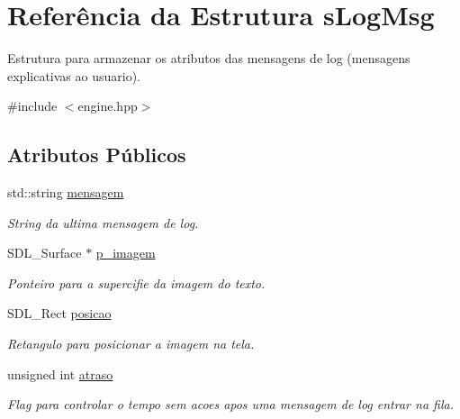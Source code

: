 \hypertarget{structsLogMsg}{
\section{Referência da Estrutura sLogMsg}
\label{structsLogMsg}
}


Estrutura para armazenar os atributos das mensagens de log (mensagens explicativas ao usuario).  




{\ttfamily \#include $<$engine.hpp$>$}

\subsection*{Atributos Públicos}
\begin{DoxyCompactItemize}
\item 
\hypertarget{structsLogMsg_a9f4f40ec9f2fb15c4e45e755a42e3f45}{
std::string \hyperlink{structsLogMsg_a9f4f40ec9f2fb15c4e45e755a42e3f45}{mensagem}}
\label{structsLogMsg_a9f4f40ec9f2fb15c4e45e755a42e3f45}

\begin{DoxyCompactList}\small\item\em String da ultima mensagem de log. \item\end{DoxyCompactList}\item 
\hypertarget{structsLogMsg_a205b348f96e71edfb700b67a371c04e2}{
SDL\_\-Surface $\ast$ \hyperlink{structsLogMsg_a205b348f96e71edfb700b67a371c04e2}{p\_\-imagem}}
\label{structsLogMsg_a205b348f96e71edfb700b67a371c04e2}

\begin{DoxyCompactList}\small\item\em Ponteiro para a supercifie da imagem do texto. \item\end{DoxyCompactList}\item 
\hypertarget{structsLogMsg_a357fe30492e0ab4f595eda19c0b17239}{
SDL\_\-Rect \hyperlink{structsLogMsg_a357fe30492e0ab4f595eda19c0b17239}{posicao}}
\label{structsLogMsg_a357fe30492e0ab4f595eda19c0b17239}

\begin{DoxyCompactList}\small\item\em Retangulo para posicionar a imagem na tela. \item\end{DoxyCompactList}\item 
\hypertarget{structsLogMsg_a2c546eb0dda8fb90151c352f598ae0f9}{
unsigned int \hyperlink{structsLogMsg_a2c546eb0dda8fb90151c352f598ae0f9}{atraso}}
\label{structsLogMsg_a2c546eb0dda8fb90151c352f598ae0f9}

\begin{DoxyCompactList}\small\item\em Flag para controlar o tempo sem acoes apos uma mensagem de log entrar na fila. \item\end{DoxyCompactList}\end{DoxyCompactItemize}


